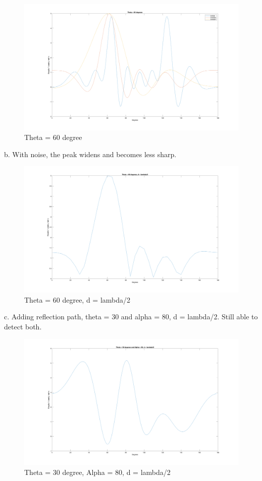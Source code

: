 \documentclass[a4paper]{article}
\begin{document}
\begin{figure}[H]
\centering
\includegraphics[width=\textwidth]{60.png}
\caption{Theta = 60 degree}
\end{figure}

b. With noise, the peak widens and becomes less sharp.

\begin{figure}[H]
\centering
\includegraphics[width=\textwidth]{b.png}
\caption{Theta = 60 degree, d = lambda/2}
\end{figure}


c. Adding reflection path, theta = 30 and alpha = 80, d = lambda/2. Still able to detect both.

\begin{figure}[H]
\centering
\includegraphics[width=\textwidth]{c.png}
\caption{Theta = 30 degree, Alpha = 80, d = lambda/2}
\end{figure}
\end{document}
